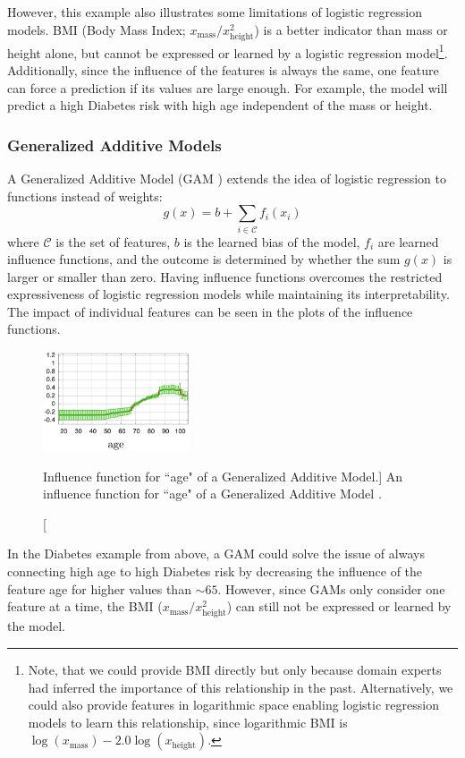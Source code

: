 However, this example also illustrates some limitations of logistic regression models.
BMI (Body Mass Index; $x_\text{mass} / x_\text{height}^2$) is a better indicator than mass or height alone, but cannot be expressed or learned by a logistic regression model\footnote{Note, that we could provide BMI directly but only because domain experts had inferred the importance of this relationship in the past. Alternatively, we could also provide features in logarithmic space enabling logistic regression models to learn this relationship, since logarithmic BMI is $\log{(x_\text{mass})} - 2.0 \log{(x_\text{height})}$.}.
Additionally, since the influence of the features is always the same, one feature can force a prediction if its values are large enough.
For example, the model will predict a high Diabetes risk with high age independent of the mass or height.

\subsubsection{Generalized Additive Models}
A Generalized Additive Model (GAM \cite{gam}) extends the idea of logistic regression to functions instead of weights:
\[
g(x) = b + \sum_{i \in \mathcal{C}} f_i(x_i)
\]
where $\mathcal{C}$ is the set of features, $b$ is the learned bias of the model, $f_i$ are learned influence functions, and the outcome is determined by whether the sum $g(x)$ is larger or smaller than zero.
Having influence functions overcomes the restricted expressiveness of logistic regression models while maintaining its interpretability.
The impact of individual features can be seen in the plots of the influence functions.

\begin{figure}
\centering
\includegraphics[height=8em,valign=t]{tex/introduction/age.png}
\caption[Influence function for ``age" of a Generalized Additive Model.]{
An influence function for ``age" of a Generalized Additive Model \cite{Caruana:2015:IMH:2783258.2788613}.
}
\label{figs:age}
\end{figure}

In the Diabetes example from above, a GAM could solve the issue of always connecting high age to high Diabetes risk by decreasing the influence of the feature age for higher values than ${\sim}65$.
However, since GAMs only consider one feature at a time, the BMI ($x_\text{mass} / x_\text{height}^2$) can still not be expressed or learned by the model.

